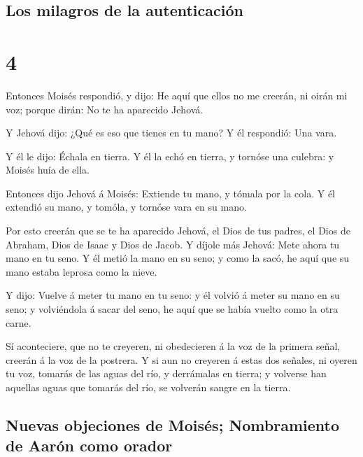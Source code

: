 \hypertarget{los-milagros-de-la-autenticaciuxf3n}{%
\subsection{Los milagros de la
autenticación}\label{los-milagros-de-la-autenticaciuxf3n}}

\hypertarget{section-3}{%
\section{4}\label{section-3}}

 Entonces Moisés respondió, y dijo: He aquí que ellos no
me creerán, ni oirán mi voz; porque dirán: No te ha aparecido Jehová.

 Y Jehová dijo: ¿Qué es eso que tienes en tu mano? Y él
respondió: Una vara.

 Y él le dijo: Échala en tierra. Y él la echó en tierra, y
tornóse una culebra: y Moisés huía de ella.

 Entonces dijo Jehová á Moisés: Extiende tu mano, y tómala
por la cola. Y él extendió su mano, y tomóla, y tornóse vara en su mano.

 Por esto creerán que se te ha aparecido Jehová, el Dios
de tus padres, el Dios de Abraham, Dios de Isaac y Dios de Jacob.
 Y díjole más Jehová: Mete ahora tu mano en tu seno. Y él
metió la mano en su seno; y como la sacó, he aquí que su mano estaba
leprosa como la nieve.

 Y dijo: Vuelve á meter tu mano en tu seno: y él volvió á
meter su mano en su seno; y volviéndola á sacar del seno, he aquí que se
había vuelto como la otra carne.

 Sí aconteciere, que no te creyeren, ni obedecieren á la
voz de la primera señal, creerán á la voz de la postrera. 
Y si aun no creyeren á estas dos señales, ni oyeren tu voz, tomarás de
las aguas del río, y derrámalas en tierra; y volverse han aquellas aguas
que tomarás del río, se volverán sangre en la tierra.

\hypertarget{nuevas-objeciones-de-moisuxe9s-nombramiento-de-aaruxf3n-como-orador}{%
\subsection{Nuevas objeciones de Moisés; Nombramiento de Aarón como
orador}\label{nuevas-objeciones-de-moisuxe9s-nombramiento-de-aaruxf3n-como-orador}}

